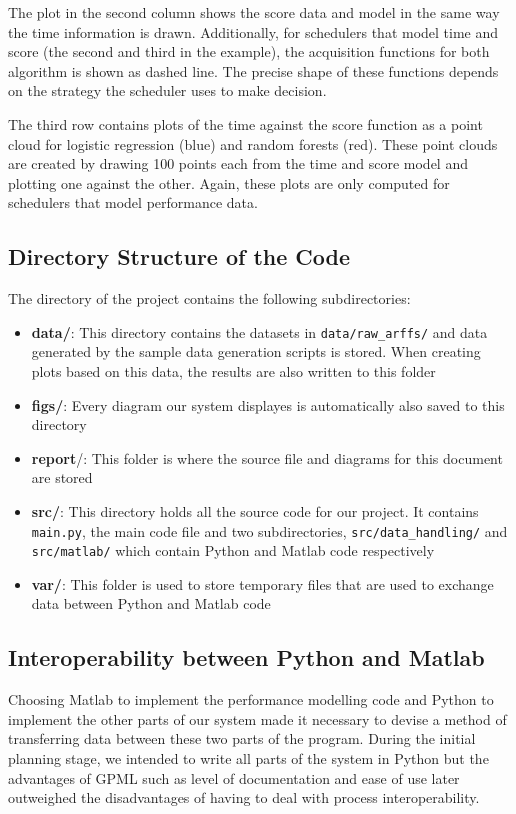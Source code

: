 \documentclass[a4paper,12pt,twoside,openright]{report}
\begin{document}
The plot in the second column shows the score data and model in the same way the time information is drawn. Additionally, for schedulers that model time and score (the second and third in the example), the acquisition functions for both algorithm is shown as dashed line. The precise shape of these functions depends on the strategy the scheduler uses to make decision. 

The third row contains plots of the time against the score function as a point cloud for logistic regression (blue) and random forests (red). These point clouds are created by drawing 100 points each from the time and score model and plotting one against the other. Again, these plots are only computed for schedulers that model performance data.





\subsection{Directory Structure of the Code}

The directory of the project contains the following subdirectories:
\begin{itemize}
\item \textbf{data/}: This directory contains the datasets in \texttt{data/raw\_arffs/} and data generated by the sample data generation scripts is stored. When creating plots based on this data, the results are also written to this folder
\item \textbf{figs/}: Every diagram our system displayes is automatically also saved to this directory
\item \textbf{report}/: This folder is where the source file and diagrams for this document are stored
\item \textbf{src/}: This directory holds all the source code for our project. It contains \texttt{main.py}, the main code file and two subdirectories, \texttt{src/data\_handling/} and \texttt{src/matlab/} which contain Python and Matlab code respectively
\item \textbf{var/}: This folder is used to store temporary files that are used to exchange data between Python and Matlab code
\end{itemize}



\subsection{Interoperability between Python and Matlab}
Choosing Matlab to implement the performance modelling code and Python to implement the other parts of our system made it necessary to devise a method of transferring data between these two parts of the program. During the initial planning stage, we intended to write all parts of the system in Python but the advantages of GPML such as level of documentation and ease of use later outweighed the disadvantages of having to deal with process interoperability.
\end{document}
